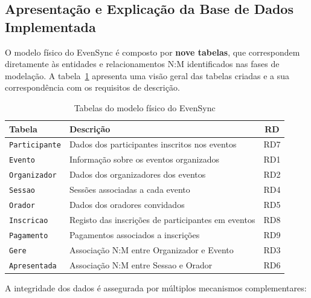 \documentclass[runningheads]{llncs}
\begin{document}
                \subsection{Apresentação e Explicação da Base de Dados Implementada}

                O modelo físico do EvenSync é composto por \textbf{nove tabelas}, que correspondem diretamente às entidades e relacionamentos N:M identificados nas fases de modelação. A tabela~\ref{tab:tabelas_fisicas} apresenta uma visão geral das tabelas criadas e a sua correspondência com os requisitos de descrição.

                \begin{table}[H]
                \centering
                \begin{tabular}{|l|l|c|}
                \hline
                \textbf{Tabela} & \textbf{Descrição} & \textbf{RD} \\ \hline
                \texttt{Participante}  & Dados dos participantes inscritos nos eventos & RD7 \\ \hline
                \texttt{Evento}        & Informação sobre os eventos organizados & RD1 \\ \hline
                \texttt{Organizador}   & Dados dos organizadores dos eventos & RD2 \\ \hline
                \texttt{Sessao}        & Sessões associadas a cada evento & RD4 \\ \hline
                \texttt{Orador}        & Dados dos oradores convidados & RD5 \\ \hline
                \texttt{Inscricao}     & Registo das inscrições de participantes em eventos & RD8 \\ \hline
                \texttt{Pagamento}     & Pagamentos associados a inscrições & RD9 \\ \hline
                \texttt{Gere}          & Associação N:M entre Organizador e Evento & RD3 \\ \hline
                \texttt{Apresentada}   & Associação N:M entre Sessao e Orador & RD6 \\ \hline
                \end{tabular}
                \vspace{0.2cm}
                \caption{Tabelas do modelo físico do EvenSync} \label{tab:tabelas_fisicas}
                \end{table}

                A integridade dos dados é assegurada por múltiplos mecanismos complementares:
\end{document}
